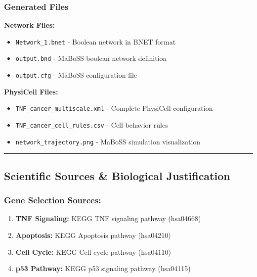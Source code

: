 \hypertarget{generated-files}{%
\subsubsection{Generated Files}\label{generated-files}}

\textbf{Network Files:}

\begin{itemize}
\tightlist
\item
  \texttt{Network\_1.bnet} - Boolean network in BNET format
\item
  \texttt{output.bnd} - MaBoSS boolean network definition
\item
  \texttt{output.cfg} - MaBoSS configuration file
\end{itemize}

\textbf{PhysiCell Files:}

\begin{itemize}
\tightlist
\item
  \texttt{TNF\_cancer\_multiscale.xml} - Complete PhysiCell
  configuration
\item
  \texttt{TNF\_cancer\_cell\_rules.csv} - Cell behavior rules
\item
  \texttt{network\_trajectory.png} - MaBoSS simulation visualization
\end{itemize}

\begin{center}\rule{0.5\linewidth}{0.5pt}\end{center}

\hypertarget{scientific-sources-biological-justification}{%
\subsection{Scientific Sources \& Biological
Justification}\label{scientific-sources-biological-justification}}

\hypertarget{gene-selection-sources}{%
\subsubsection{Gene Selection Sources:}\label{gene-selection-sources}}

\begin{enumerate}
\def\labelenumi{\arabic{enumi}.}
\tightlist
\item
  \textbf{TNF Signaling:} KEGG TNF signaling pathway (hsa04668)
\item
  \textbf{Apoptosis:} KEGG Apoptosis pathway (hsa04210)
\item
  \textbf{Cell Cycle:} KEGG Cell cycle pathway (hsa04110)
\item
  \textbf{p53 Pathway:} KEGG p53 signaling pathway (hsa04115)
\end{enumerate}


